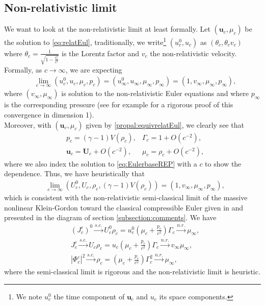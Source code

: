\documentclass[a4paper, 15pt]{article}
\numberwithin{equation}{section}
\begin{document}
\subsection{Non-relativistic limit}
\label{subsection:NRlimitEul}
We want to look at the non-relativistic limit at least formally. Let $(\textbf{u}_c,\mu_c)$ be the solution to \eqref{eq:relatEul}, traditionally, we write\footnote{We note $u^0_c$ the time component of $\textbf{u}_c$ and $u_c$ its space components.} $(u^0_c,u_c)$ as $(\theta_c,\theta_c v_c)$ where $\theta_c=\frac{1}{\sqrt{1-\frac{v_c^2}{c^2 }}}$ is the Lorentz factor and $v_c$ the non-relativistic velocity. Formally, as $c\to \infty$, we are expecting 
\begin{align}
\label{eq:NRlimitEul}
    &\lim_{c\to \infty} (u_c^0,u_c,\mu_c,p_c)=(u_\infty^0,u_\infty,\mu_\infty,p_\infty)=(1,v_\infty,\mu_\infty,p_\infty),
\end{align}
where $(v_\infty,\mu_\infty)$ is solution to the non-relativistic Euler equations and where $p_\infty$ is the corresponding pressure (see for example \cite{zbMATH07119817,zbMATH07531778,MAI2022336,zbMATH05077591,zbMATH00840326,zbMATH01309659,zbMATH07114642} for a rigorous proof of this convergence in dimension 1).\\ Moreover, with $(\textbf{u}_c,\mu_c)$ given by \ref{propal:equivrelatEul}, we clearly see that 
\begin{align*}
    &p_c=(\gamma-1)V(\rho_c), &\Gamma_c=1+O(c^{-2}),\\
    &\textbf{u}_c=\textbf{U}_c+O(c^{-2}), &\mu_c=\rho_c+O(c^{-2}),
\end{align*}
where we also index the solution to \eqref{eq:EulerbaseREP} with a $c$ to show the dependence. Thus, we have heuristically that 
\begin{align*}
    &\lim_{c\to \infty} (U_c^0,U_c,\rho_c,(\gamma-1)V(\rho_c))=(1,v_\infty,\mu_\infty,p_\infty),
\end{align*}
which is consistent with the non-relativistic semi-classical limit of the massive nonlinear Klein-Gordon toward the classical compressible Euler given in \cite{zbMATH06101438} and presented in the diagram of section \ref{subsection:comments}. We have 
\begin{align*}
    &(J^\varepsilon_c)^0\xrightarrow{s.c.}U^0_c\rho_c=u^0_c(\mu_c+\frac{p_c}{c^2})\Gamma_c\xrightarrow{n.r.}\mu_\infty,\\
      &J^\varepsilon_c\xrightarrow{s.c.}U_c\rho_c=u_c(\mu_c+\frac{p_c}{c^2})\Gamma_c\xrightarrow{n.r.}v_\infty\mu_\infty,\\
        &|\Phi_c^\varepsilon|^2\xrightarrow{s.c.}\rho_c=(\mu_c+\frac{p_c}{c^2})\Gamma_c^2\xrightarrow{n.r.}\mu_\infty,
\end{align*}
where the semi-classical limit is rigorous and the non-relativistic limit is heuristic. 
\appendix
\end{document}
